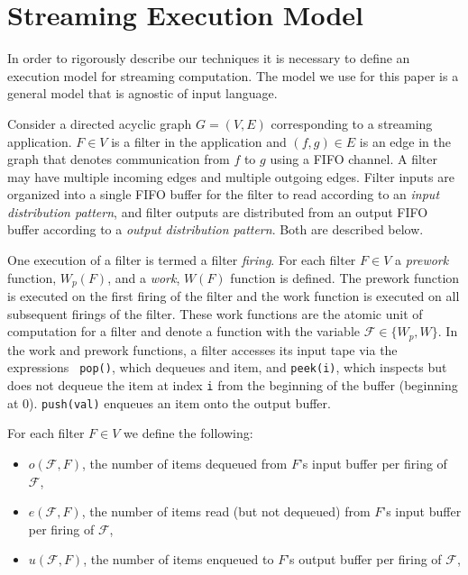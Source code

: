 \section{Streaming Execution Model}

In order to rigorously describe our techniques it is necessary to
define an execution model for streaming computation. The model we use
for this paper is a general model that is agnostic of input language.

Consider a directed acyclic graph $G = (V, E)$ corresponding to a
streaming application. $F \in V$ is a filter in the application and
$(f, g) \in E$ is an edge in the graph that denotes communication from
$f$ to $g$ using a FIFO channel.  A filter may have multiple incoming
edges and multiple outgoing edges.  Filter inputs are organized into a
single FIFO buffer for the filter to read according to an {\it input
distribution pattern}, and filter outputs are distributed from an
output FIFO buffer according to a {\it output distribution pattern}.  Both
are described below.

One execution of a filter is termed a filter {\it firing}. For each
filter $F \in V$ a {\it prework} function, $W_p(F)$, and a {\it work},
$W(F)$ function is defined.  The prework function is executed on the
first firing of the filter and the work function is executed on all
subsequent firings of the filter.  These work functions are the atomic
unit of computation for a filter and denote a function with the
variable $\mathcal{F} \in \{W_p, W\}$.  In the work and prework
functions, a filter accesses its input tape via the expressions {\tt
pop()}, which dequeues and item, and {\tt peek(i)}, which inspects but
does not dequeue the item at index {\tt i} from the beginning of the
buffer (beginning at 0).  {\tt push(val)} enqueues an item onto the
output buffer.

For each filter $F \in V$ we define the following:
\begin{itemize}

\item $o(\mathcal{F}, F)$, the number of items dequeued from $F$'s
input buffer per firing of $\mathcal{F}$,

\item $e(\mathcal{F}, F)$, the number of items read (but not dequeued)
from $F$'s input buffer per firing of $\mathcal{F}$,

\item $u(\mathcal{F}, F)$, the number of items enqueued to $F$'s
output buffer per firing of $\mathcal{F}$,

\end{itemize}

